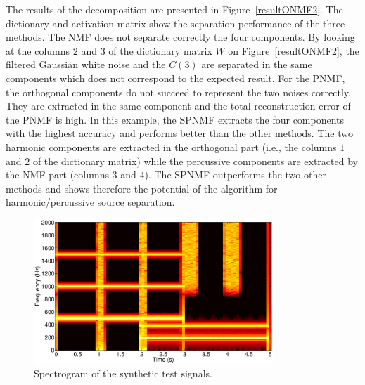 The results of the decomposition are presented in Figure~\ref{resultONMF2}. The dictionary and activation matrix show the separation performance of the three methods. The NMF does not separate correctly the four components. By looking at the columns $2$ and $3$ of the dictionary matrix $W$ on Figure~\ref{resultONMF2}, the filtered Gaussian white noise and the $C(3)$ are separated in the same components which does not correspond to the expected result.
For the PNMF, the orthogonal components do not succeed to represent the two noises correctly. They are extracted in the same component and the total reconstruction error of the PNMF is high.
In this example, the SPNMF extracts the four components with the highest accuracy and performs better than the other methods. The two harmonic components are extracted in the orthogonal part (i.e., the columns $1$ and $2$ of the dictionary matrix) while the percussive components are extracted by the NMF part (columns $3$ and $4$). The SPNMF outperforms the two other methods and shows therefore the potential of the algorithm for harmonic/percussive source separation.
%

\begin{figure}[htb]

  \centering 
  \includegraphics[width=9cm]{fig/synthetictestspectrogram.eps}
  \caption{\label{SpectroSynth} Spectrogram of the synthetic test signals.}
  
\end{figure}

